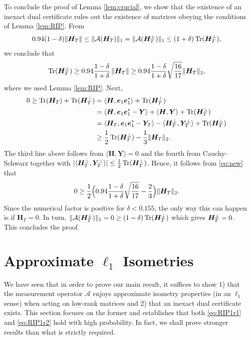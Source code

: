 \documentclass[11pt]{article}
\newcommand{\<}{\langle}
\renewcommand{\>}{\rangle}
\newcommand{\bH}{\bm{H}}
\newcommand{\bY}{\bm{Y}}
\newcommand{\be}{\bm{e}}
\newcommand{\tr}{\operatorname{Tr}}
\numberwithin{equation}{section}
\newcommand{\cA}{\mathcal{A}}
\begin{document}
To conclude the proof of Lemma \ref{lem:crucial}, we show that the
existence of an inexact dual certificate rules out the existence of
matrices obeying the conditions of Lemma \ref{lem:RIP}. From
\[
0.94(1-\delta) \|\bH_T\| \le \|\cA(\bH_T)\|_1 = \|\cA(\bH_\Tp)\|_1 \le
(1+\delta) \tr(\bH_\Tp),
\]
we conclude that 
\begin{equation}
\label{eq:new}
\tr(\bH_\Tp) \ge 0.94 \frac{1-\delta}{1+\delta} \, \|\bH_T\| \ge 0.94
\frac{1-\delta}{1+\delta} \sqrt{\frac{16}{17}} \|\bH_T\|_2,
\end{equation}
where we used Lemma \ref{lem:RIP}. Next, 
\begin{align*}
0 \ge \tr(\bH_T) + \tr(\bH_\Tp) & = \<\bH, \be_1 \be_1^*\> + \tr(\bH_\Tp) \\
& = \<\bH, \be_1 \be_1^* - \bY\> + \<\bH,\bY\> +   \tr(\bH_\Tp)\\
& =  \<\bH_T, \be_1 \be_1^* - \bY_T\> - \<\bH_\Tp, \bY_\Tp\> +  \tr(\bH_\Tp)\\
& \ge \frac12 \tr(\bH_\Tp) - \frac{1}{3} \|\bH_T\|_2.  
\end{align*}
The third line above follows from $\<\bH, \bY\> = 0$ and the fourth from
Cauchy-Schwarz together with $|\<\bH_\Tp, \bY_\Tp\>| \le \frac12
\tr(\bH_\Tp)$. Hence, it follows from \eqref{eq:new} that 
\[
0 \ge \frac12 \Bigl(0.94 \frac{1-\delta}{1+\delta}
\sqrt{\frac{16}{17}} - \frac{2}{3}\Bigr) \|\bH_T\|_2.
\]
Since the numerical factor is positive for $\delta < 0.155$, the only
way this can happen is if $\bH_T = 0$. In turn,
$\|\mathcal{A}(\bH_\Tp)\|_1 = 0 \ge (1-\delta) \tr(\bH_\Tp)$ which gives
$\bH_\Tp = 0$. This concludes the proof.


\section{Approximate $\ell_1$ Isometries}
\label{sec:isometries}

We have seen that in order to prove our main result, it suffices to
show 1) that the measurement operator $\cA$ enjoys approximate isometry
properties (in an $\ell_1$ sense) when acting on low-rank matrices and
2) that an inexact dual certificate exists. This section focuses on
the former and establishes that both \eqref{eq:RIP1r1} and
\eqref{eq:RIP1r2} hold with high probability. In fact, we shall prove
stronger results than what is strictly required.
\end{document}
